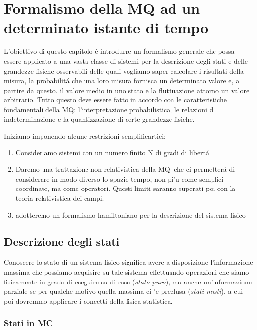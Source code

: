 \vspace{5em}
\section{\huge Formalismo della MQ ad un determinato istante di tempo}

L'obiettivo di questo capitolo \'e introdurre un formalismo generale che possa essere applicato a una vasta classe di sistemi per la descrizione degli stati e delle grandezze fisiche osservabili delle quali vogliamo saper calcolare i risultati della misura, la probabilit\'a che una loro misura fornisca un determinato valore e, a partire da questo, il valore medio in uno stato e la fluttuazione attorno un valore arbitrario. Tutto questo deve essere fatto in accordo con le caratteristiche fondamentali della MQ: l'interpretazione probabilistica, le relazioni di indeterminazione e la quantizzazione di certe grandezze fisiche.

Iniziamo imponendo alcune restrizioni semplificartici:
\begin{enumerate}
\item Consideriamo sistemi con un numero finito N di gradi di libert\'a 

\item Daremo una trattazione non relativistica della MQ, che ci permetter\'a di considerare in modo diverso lo spazio-tempo, non pi'u come semplici coordinate, ma come operatori. Questi limiti saranno superati poi con la teoria relativistica dei campi.

\item adotteremo un formalismo hamiltoniano per la descrizione del sistema fisico
\end{enumerate}

\subsection{Descrizione degli stati}

Conoscere lo stato di un sistema fisico significa avere a disposizione l'informazione massima che possiamo acquisire su tale sistema effettuando operazioni che siamo fisicamente in grado di eseguire su di esso (\textit{stato puro}), ma anche un'informazione parziale se per qualche motivo quella massima ci 'e preclusa (\textit{stati misti}), a cui poi dovremmo applicare i concetti della fisica statistica.


\subsubsection{Stati in MC}

